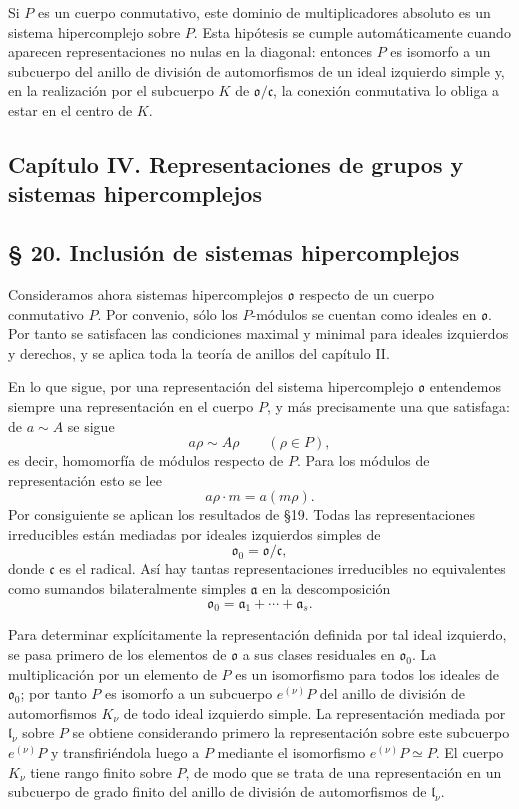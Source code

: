 \documentclass[11pt]{article}
\providecommand{\mo}{\mathfrak{o}}
\providecommand{\ma}{\mathfrak{a}}
\providecommand{\mc}{\mathfrak{c}}
\providecommand{\ml}{\mathfrak{l}}
\begin{document}
Si $P$ es un cuerpo conmutativo, este dominio de multiplicadores absoluto es un sistema hipercomplejo sobre $P$. Esta hipótesis se cumple automáticamente cuando aparecen representaciones no nulas en la diagonal: entonces $P$ es isomorfo a un subcuerpo del anillo de división de automorfismos de un ideal izquierdo simple y, en la realización por el subcuerpo $K$ de $\mo/\mc$, la conexión conmutativa lo obliga a estar en el centro de $K$.

\subsection*{Capítulo IV. Representaciones de grupos y sistemas hipercomplejos}

\subsection*{§ 20. Inclusión de sistemas hipercomplejos}

Consideramos ahora sistemas hipercomplejos $\mo$ respecto de un cuerpo conmutativo $P$. Por convenio, sólo los $P$-módulos se cuentan como ideales en $\mo$. Por tanto se satisfacen las condiciones maximal y minimal para ideales izquierdos y derechos, y se aplica toda la teoría de anillos del capítulo II.

En lo que sigue, por una representación del sistema hipercomplejo $\mo$ entendemos siempre una representación en el cuerpo $P$, y más precisamente una que satisfaga: de $a\sim A$ se sigue
\[
        a\rho\sim A\rho\qquad(\rho\in P),
\]
es decir, homomorfía de módulos respecto de $P$. Para los módulos de representación esto se lee
\[
        a\rho\cdot m=a(m\rho).
\]
Por consiguiente se aplican los resultados de §19. Todas las representaciones irreducibles están mediadas por ideales izquierdos simples de
\[
        \mo_0=\mo/\mc,
\]
donde $\mc$ es el radical. Así hay tantas representaciones irreducibles no equivalentes como sumandos bilateralmente simples $\ma$ en la descomposición
\[
        \mo_0=\ma_1+\cdots+\ma_s.
\]

Para determinar explícitamente la representación definida por tal ideal izquierdo, se pasa primero de los elementos de $\mo$ a sus clases residuales en $\mo_0$. La multiplicación por un elemento de $P$ es un isomorfismo para todos los ideales de $\mo_0$; por tanto $P$ es isomorfo a un subcuerpo $e^{(\nu)}P$ del anillo de división de automorfismos $K_\nu$ de todo ideal izquierdo simple. La representación mediada por $\ml_\nu$ sobre $P$ se obtiene considerando primero la representación sobre este subcuerpo $e^{(\nu)}P$ y transfiriéndola luego a $P$ mediante el isomorfismo $e^{(\nu)}P\simeq P$. El cuerpo $K_\nu$ tiene rango finito sobre $P$, de modo que se trata de una representación en un subcuerpo de grado finito del anillo de división de automorfismos de $\ml_\nu$.
\end{document}
